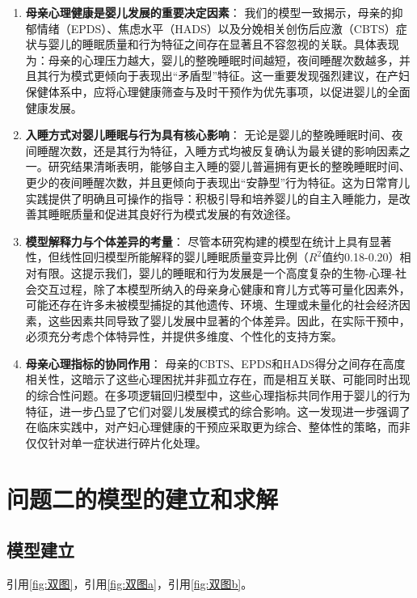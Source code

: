 \documentclass[withoutpreface,bwprint]{cumcmthesis}
\begin{document}
\begin{enumerate}
    \item \textbf{母亲心理健康是婴儿发展的重要决定因素}：
    我们的模型一致揭示，母亲的抑郁情绪（EPDS）、焦虑水平（HADS）以及分娩相关创伤后应激（CBTS）症状与婴儿的睡眠质量和行为特征之间存在显著且不容忽视的关联。具体表现为：母亲的心理压力越大，婴儿的整晚睡眠时间越短，夜间睡醒次数越多，并且其行为模式更倾向于表现出“矛盾型”特征。这一重要发现强烈建议，在产妇保健体系中，应将心理健康筛查与及时干预作为优先事项，以促进婴儿的全面健康发展。
    \item \textbf{入睡方式对婴儿睡眠与行为具有核心影响}：
    无论是婴儿的整晚睡眠时间、夜间睡醒次数，还是其行为特征，入睡方式均被反复确认为最关键的影响因素之一。研究结果清晰表明，能够自主入睡的婴儿普遍拥有更长的整晚睡眠时间、更少的夜间睡醒次数，并且更倾向于表现出“安静型”行为特征。这为日常育儿实践提供了明确且可操作的指导：积极引导和培养婴儿的自主入睡能力，是改善其睡眠质量和促进其良好行为模式发展的有效途径。
    \item \textbf{模型解释力与个体差异的考量}：
    尽管本研究构建的模型在统计上具有显著性，但线性回归模型所能解释的婴儿睡眠质量变异比例（$R^2$值约0.18-0.20）相对有限。这提示我们，婴儿的睡眠和行为发展是一个高度复杂的生物-心理-社会交互过程，除了本模型所纳入的母亲身心健康和育儿方式等可量化因素外，可能还存在许多未被模型捕捉的其他遗传、环境、生理或未量化的社会经济因素，这些因素共同导致了婴儿发展中显著的个体差异。因此，在实际干预中，必须充分考虑个体特异性，并提供多维度、个性化的支持方案。
    \item \textbf{母亲心理指标的协同作用}：
    母亲的CBTS、EPDS和HADS得分之间存在高度相关性，这暗示了这些心理困扰并非孤立存在，而是相互关联、可能同时出现的综合性问题。在多项逻辑回归模型中，这些心理指标共同作用于婴儿的行为特征，进一步凸显了它们对婴儿发展模式的综合影响。这一发现进一步强调了在临床实践中，对产妇心理健康的干预应采取更为综合、整体性的策略，而非仅仅针对单一症状进行碎片化处理。
\end{enumerate}


\section{问题二的模型的建立和求解}
\subsection{模型建立}

引用\cref{fig:双图}，引用\cref{fig:双图a}，引用\cref{fig:双图b}。
\end{document}
